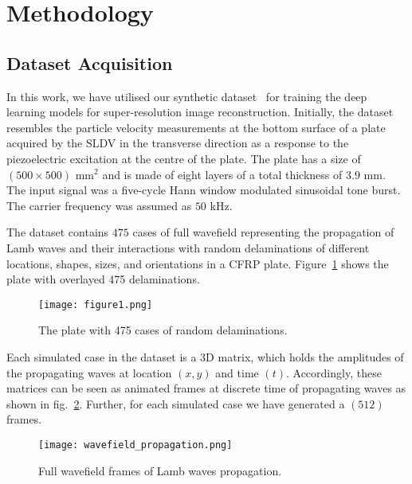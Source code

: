 \section{Methodology}
\subsection{Dataset Acquisition}
In this work, we have utilised our synthetic  dataset~\cite{kudela_pawel_2021_5414555} for training the deep learning models for super-resolution image reconstruction.  
Initially, the dataset resembles the particle velocity measurements at the bottom surface of a plate acquired by the SLDV in the transverse direction as a response to the piezoelectric excitation at the centre of the plate.
The plate has a size of \( (500\times500)\) mm\(^2\) and is made of eight layers of a total thickness of \(3.9\) mm.
The input signal was a five-cycle Hann window modulated sinusoidal tone burst. The carrier frequency was assumed as \(50\) kHz.

The dataset contains \(475\) cases of full wavefield representing the propagation of Lamb waves and their interactions with random delaminations of different locations, shapes, sizes, and orientations in a CFRP plate.
Figure~\ref{fig:All_cases} shows the plate with overlayed 475 delaminations.
\begin{figure} [h!]
	\begin{center}
		\texttt{[image: figure1.png]}
	\end{center}
	\caption{The plate with 475 cases of random delaminations.} 
	\label{fig:All_cases}
\end{figure}

Each simulated case in the dataset is a 3D matrix, which holds the amplitudes of the propagating waves at location \((x,y)\) and time \((t)\). 
Accordingly, these matrices can be seen as animated frames at discrete time of propagating waves as shown in fig.~\ref{fig:wavefield_propagation}. 
Further, for each simulated case we have generated a \((512)\) frames.
\begin{figure} [h!]
	\begin{center}
		\texttt{[image: wavefield\_propagation.png]}
	\end{center}
	\caption{Full wavefield frames of Lamb waves propagation.} 
	\label{fig:wavefield_propagation}
\end{figure}

